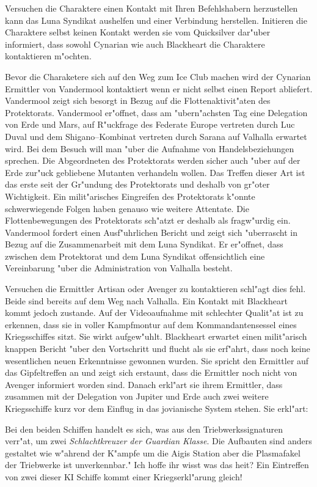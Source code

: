 Versuchen die Charaktere einen Kontakt mit Ihren Befehlshabern herzustellen kann das Luna Syndikat aushelfen und einer Verbindung herstellen. Initieren die Charaktere selbst keinen Kontakt werden sie vom Quicksilver dar"uber informiert, dass sowohl Cynarian wie auch Blackheart die Charaktere kontaktieren m"ochten.

Bevor die Charaketere sich auf den Weg zum Ice Club machen wird der Cynarian Ermittler von Vandermool kontaktiert wenn er nicht selbst einen Report abliefert. Vandermool zeigt sich besorgt in Bezug auf die Flottenaktivit"aten des Protektorats. Vandermool er"offnet, dass am "ubern"achsten Tag eine Delegation von Erde und Mars, auf R"uckfrage des Federate Europe vertreten durch Luc Duval und dem Shigano--Kombinat vertreten durch Sarana auf Valhalla erwartet wird. Bei dem Besuch will man "uber die Aufnahme von Handelsbeziehungen sprechen. Die Abgeordneten des Protektorats werden sicher auch "uber auf der Erde zur"uck gebliebene Mutanten verhandeln wollen. Das Treffen dieser Art ist das erste seit der Gr"undung des Protektorats und deshalb von gr"o\3ter Wichtigkeit. Ein milit"arisches Eingreifen des Protektorats k"onnte schwerwiegende Folgen haben genauso wie weitere Attentate. Die Flottenbewegungen des Protektorats sch"atzt er deshalb als fragw"urdig ein. Vandermool fordert einen Ausf"uhrlichen Bericht und zeigt sich "uberrascht in Bezug auf die Zusammenarbeit mit dem Luna Syndikat. Er er"offnet, dass zwischen dem Protektorat und dem Luna Syndikat offensichtlich eine Vereinbarung "uber die Administration von Valhalla besteht.

Versuchen die Ermittler Artisan oder Avenger zu kontaktieren schl"agt dies fehl. Beide sind bereits auf dem Weg nach Valhalla. Ein Kontakt mit Blackheart kommt jedoch zustande. Auf der Videoaufnahme mit schlechter Qualit"at ist zu erkennen, dass sie in voller Kampfmontur auf dem Kommandantensessel eines Kriegsschiffes sitzt. Sie wirkt aufgew"uhlt. Blackheart erwartet einen milit"arisch knappen Bericht "uber den Vortschritt und flucht als sie erf"ahrt, dass noch keine wesentlichen neuen Erkenntnisse gewonnen wurden. Sie spricht den Ermittler auf das Gipfeltreffen an und zeigt sich erstaunt, dass die Ermittler noch nicht von Avenger informiert worden sind. Danach erkl"art sie ihrem Ermittler, dass zusammen mit der Delegation von Jupiter und Erde auch zwei weitere Kriegsschiffe kurz vor dem Einflug in das jovianische System stehen. Sie erkl"art:

\begin{speech}
	Bei den beiden Schiffen handelt es sich, was aus den Triebwerkssignaturen verr"at, um zwei \emph{Schlachtkreuzer der Guardian Klasse}. Die Aufbauten sind anders gestaltet wie w"ahrend der K"ampfe um die Aigis Station aber die Plasmafakel der Triebwerke ist unverkennbar." Ich hoffe ihr wisst was das hei\3t? Ein Eintreffen von zwei dieser KI Schiffe kommt einer Kriegserkl"arung gleich! 
\end{speech}

